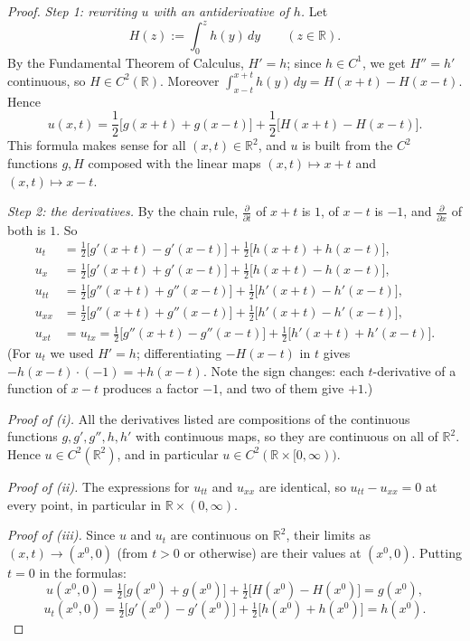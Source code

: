 \documentclass[11pt]{article}
\theoremstyle{plain}
\theoremstyle{definition}
\theoremstyle{remark}
\begin{document}
\begin{proof}
\emph{Step 1: rewriting $u$ with an antiderivative of $h$.} Let
$$ H(z) := \int_0^z h(y)\, dy \qquad (z \in \mathbb{R}). $$
By the Fundamental Theorem of Calculus, $H' = h$; since $h \in C^1$, we get $H'' = h'$ continuous, so $H \in C^2(\mathbb{R})$. Moreover $\int_{x-t}^{x+t}h(y)\,dy = H(x + t) - H(x - t)$. Hence
$$ u(x,t) = \frac12\big[g(x + t) + g(x - t)\big] + \frac12\big[H(x + t) - H(x - t)\big]. $$
This formula makes sense for all $(x,t) \in \mathbb{R}^2$, and $u$ is built from the $C^2$ functions $g, H$ composed with the linear maps $(x,t) \mapsto x + t$ and $(x,t) \mapsto x - t$.

\emph{Step 2: the derivatives.} By the chain rule, $\frac{\partial}{\partial t}$ of $x + t$ is $1$, of $x - t$ is $-1$, and $\frac{\partial}{\partial x}$ of both is $1$. So
\begin{align*}
u_t &= \tfrac12\big[g'(x + t) - g'(x - t)\big] + \tfrac12\big[h(x + t) + h(x - t)\big], \\
u_x &= \tfrac12\big[g'(x + t) + g'(x - t)\big] + \tfrac12\big[h(x + t) - h(x - t)\big], \\
u_{tt} &= \tfrac12\big[g''(x + t) + g''(x - t)\big] + \tfrac12\big[h'(x + t) - h'(x - t)\big], \\
u_{xx} &= \tfrac12\big[g''(x + t) + g''(x - t)\big] + \tfrac12\big[h'(x + t) - h'(x - t)\big], \\
u_{xt} &= u_{tx} = \tfrac12\big[g''(x + t) - g''(x - t)\big] + \tfrac12\big[h'(x + t) + h'(x - t)\big].
\end{align*}
(For $u_t$ we used $H' = h$; differentiating $-H(x - t)$ in $t$ gives $-h(x - t)\cdot(-1) = +h(x - t)$. Note the sign changes: each $t$-derivative of a function of $x - t$ produces a factor $-1$, and two of them give $+1$.)

\emph{Proof of (i).} All the derivatives listed are compositions of the continuous functions $g, g', g'', h, h'$ with continuous maps, so they are continuous on all of $\mathbb{R}^2$. Hence $u \in C^2(\mathbb{R}^2)$, and in particular $u \in C^2(\mathbb{R}\times[0,\infty))$.

\emph{Proof of (ii).} The expressions for $u_{tt}$ and $u_{xx}$ are identical, so $u_{tt} - u_{xx} = 0$ at every point, in particular in $\mathbb{R} \times (0,\infty)$.

\emph{Proof of (iii).} Since $u$ and $u_t$ are continuous on $\mathbb{R}^2$, their limits as $(x,t) \to (x^0,0)$ (from $t > 0$ or otherwise) are their values at $(x^0,0)$. Putting $t = 0$ in the formulas:
$$ u(x^0,0) = \tfrac12\big[g(x^0) + g(x^0)\big] + \tfrac12\big[H(x^0) - H(x^0)\big] = g(x^0), $$
$$ u_t(x^0,0) = \tfrac12\big[g'(x^0) - g'(x^0)\big] + \tfrac12\big[h(x^0) + h(x^0)\big] = h(x^0). $$
\end{proof}
\end{document}
